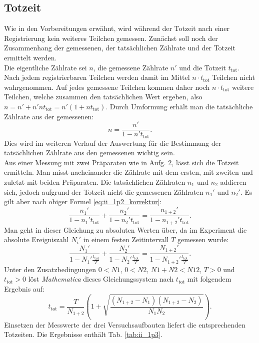 \subsection{Totzeit}
Wie in den Vorbereitungen erwähnt, wird während der Totzeit nach einer Registrierung kein weiteres Teilchen gemessen. Zunächst soll noch der Zusammenhang der gemessenen, der tatsächlichen Zählrate und der Totzeit ermittelt werden.\\
Die eigentliche Zählrate sei $n$, die gemessene Zählrate $n'$ und die Totzeit $t_\mathrm{tot}$. Nach jedem registrierbaren Teilchen werden damit im Mittel $n \cdot t_\mathrm{tot}$ Teilchen nicht wahrgenommen. Auf jedes gemessene Teilchen kommen daher noch $n \cdot t_\mathrm{tot}$ weitere Teilchen, welche zusammen den tatsächlichen Wert ergeben, also $n = n' + n'nt_\mathrm{tot} = n'(1+nt_\mathrm{tot})$. Durch Umformung erhält man die tatsächliche Zählrate aus der gemessenen:
\begin{equation}
n = \frac{n'}{1-n't_\mathrm{tot}}. \label{eq:ii_1p2_korrektur}
\end{equation}
Dies wird im weiteren Verlauf der Auswertung für die Bestimmung der tatsächlichen Zählrate aus den gemessenen wichtig sein.\\
Aus einer Messung mit zwei Präparaten wie in Aufg. 2, lässt sich die Totzeit ermitteln. Man misst nacheinander die Zählrate mit dem ersten, mit zweiten und zuletzt mit beiden Präparaten. Die tatsächlichen Zählraten $n_1$ und $n_2$ addieren sich, jedoch aufgrund der Totzeit nicht die gemessenen Zählraten $n_1'$ und $n_2'$. Es gilt aber nach obiger Formel \eqref{eq:ii_1p2_korrektur}:
\begin{equation}
\frac{n_1'}{1-n_1't_\mathrm{tot}} + \frac{n_2'}{1-n_2't_\mathrm{tot}} = \frac{n_{1+2}'}{1-n_{1+2}'t_\mathrm{tot}}.
\end{equation}
Man geht in dieser Gleichung zu absoluten Werten über, da im Experiment die absolute Ereigniszahl $N_i'$ in einem festen Zeitintervall $T$ gemessen wurde:
\begin{equation}
\frac{N_1'}{1-N_1'\frac{t_\mathrm{tot}}{T}} + \frac{N_2'}{1-N_2'\frac{t_\mathrm{tot}}{T}} = \frac{N_{1+2}'}{1-N_{1+2}'\frac{t_\mathrm{tot}}{T}}.
\end{equation}
Unter den Zusatzbedingungen $0 < N1$, $0 < N2$, $N1 + N2 < N12$, $T > 0$ und $t_\mathrm{tot} > 0$ löst \textit{Mathematica} dieses Gleichungssystem nach $t_\mathrm{tot}$ mit folgendem Ergebnis auf:
\begin{equation}
t_\mathrm{tot} = \frac{T}{N_{1+2}}\left(1+\sqrt{\frac{(N_{1+2}-N_1)(N_{1+2}-N_2)}{N_1 N_2}}\right).
\end{equation}
Einsetzen der Messwerte der drei Versuchsaufbauten liefert die entsprechenden Totzeiten. Die Ergebnisse enthält Tab. \ref{tab:ii_1p3}.

